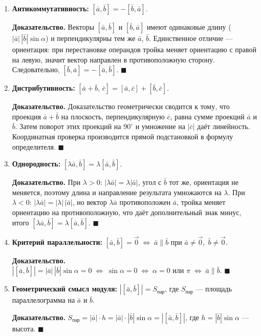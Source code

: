 \documentclass[12pt,a4paper]{article}
\newenvironment{myproof}{\noindent\textbf{Доказательство.}}{\hfill$\blacksquare$}
\newcommand{\va}{\bar{a}}
\newcommand{\vb}{\bar{b}}
\newcommand{\vc}{\bar{c}}
\begin{document}
\begin{enumerate}
  \item \textbf{Антикоммутативность:} $[\va, \vb] = -[\vb, \va]$.

    \begin{myproof}
      Векторы $[\va,\vb]$ и $[\vb,\va]$ имеют одинаковые длину
      ($|\va|\,|\vb|\sin\alpha$) и перпендикулярны тем же $\va$, $\vb$.
      Единственное отличие --- ориентация: при перестановке операндов
      тройка меняет ориентацию с правой на левую, значит вектор
      направлен в противоположную сторону. Следовательно,
      $[\vb,\va] = -[\va,\vb]$.
    \end{myproof}

  \item \textbf{Дистрибутивность:}
    $[\va + \vb,\,\vc] = [\va, \vc] + [\vb, \vc]$.

    \begin{myproof}
      Доказательство геометрически сводится к тому, что проекция
      $\va + \vb$ на плоскость, перпендикулярную $\vc$, равна сумме
      проекций $\va$ и $\vb$. Затем поворот этих проекций на $90^\circ$
      и умножение на $|\vc|$ даёт линейность. Координатная проверка
      производится прямой подстановкой в формулу определителя.
    \end{myproof}

  \item \textbf{Однородность:} $[\lambda\va, \vb] = \lambda[\va, \vb]$.

    \begin{myproof}
      При $\lambda > 0$: $|\lambda\va| = \lambda|\va|$, угол с $\vb$
      тот же, ориентация не меняется, поэтому длина и направление
      результата умножаются на $\lambda$.
      При $\lambda < 0$: $|\lambda\va| = |\lambda|\,|\va|$, но вектор
      $\lambda\va$ противоположен $\va$, тройка меняет ориентацию на
      противоположную, что даёт дополнительный знак минус, итого
      $[\lambda\va,\vb] = \lambda[\va,\vb]$.
    \end{myproof}

  \item \textbf{Критерий параллельности:}
    $[\va, \vb] = \vec{0} \;\Leftrightarrow\; \va \parallel \vb$
    при $\va \neq \vec{0},\; \vb \neq \vec{0}$.

    \begin{myproof}
      $|[\va,\vb]| = |\va|\,|\vb|\sin\alpha = 0
      \;\Leftrightarrow\; \sin\alpha = 0
      \;\Leftrightarrow\; \alpha = 0 \text{ или } \pi
      \;\Leftrightarrow\; \va \parallel \vb$.
    \end{myproof}

  \item \textbf{Геометрический смысл модуля:}
    $|[\va, \vb]| = S_{\text{пар}}$, где $S_{\text{пар}}$ ---
    площадь параллелограмма на $\va$ и $\vb$.

    \begin{myproof}
      $S_{\text{пар}} = |\va|\cdot h = |\va|\cdot|\vb|\sin\alpha
      = |[\va,\vb]|$, где $h = |\vb|\sin\alpha$ --- высота.
    \end{myproof}
\end{enumerate}
\end{document}
